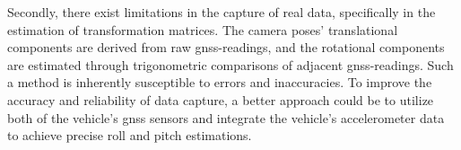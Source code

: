 Secondly, there exist limitations in the capture of real data, specifically in the estimation of transformation matrices. The camera poses' translational components are derived from raw \acrshort{gnss}-readings, and the rotational components are estimated through trigonometric comparisons of adjacent \acrshort{gnss}-readings. Such a method is inherently susceptible to errors and inaccuracies. To improve the accuracy and reliability of data capture, a better approach could be to utilize both of the vehicle's \acrshort{gnss} sensors and integrate the vehicle's accelerometer data to achieve precise roll and pitch estimations.